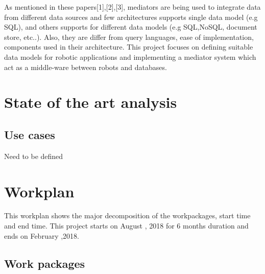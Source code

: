 \documentclass[12pt]{article}
\begin{document}
As mentioned in these papers[1],[2],[3], mediators are being used to integrate data from different data sources and few architectures supports single data model (e.g SQL), and others supports for different data models (e.g SQL,NoSQL, document store, etc..). Also, they are differ from query languages, ease of implementation, components used in their architecture. This project focuses on defining suitable data models for robotic applications and implementing a mediator system which act as a middle-ware between robots and databases. 
 



\newpage


\section{State of the art analysis}







\subsection{Use cases}
Need to be defined

\section{Workplan}
This workplan shows the major decomposition of the workpackages, start time and end time. This project starts on August , 2018 for 6 months duration and ends on February ,2018.
\newpage
\subsection{Work packages}


\end{document}

